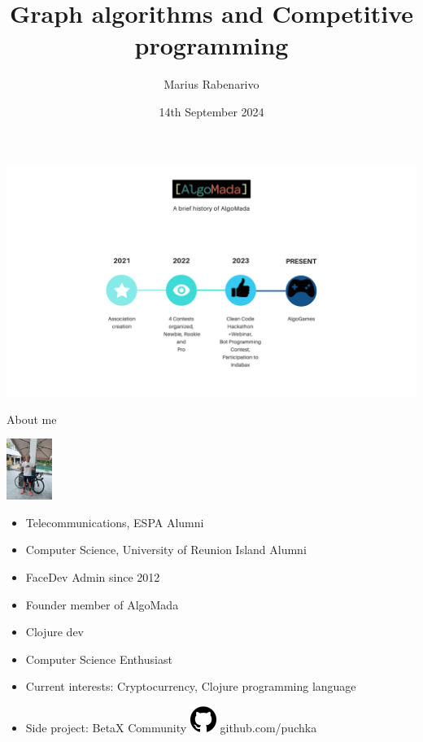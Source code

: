 \documentclass[ignorenonframetext,]{beamer}
\title{Graph algorithms and Competitive programming}
\author{Marius Rabenarivo}
\date{14th September 2024}
\providecommand{\tightlist}{%
  \setlength{\itemsep}{0pt}\setlength{\parskip}{0pt}}
\begin{document}
\frame{\titlepage}

\begin{frame}

\includegraphics{AlgoMada.png}

\end{frame}

\begin{frame}{About me}
\protect\hypertarget{about-me}{}

\includegraphics[width=\textwidth,height=0.78125in]{marius.jpg}

\begin{itemize}
\tightlist
\item
  Telecommunications, ESPA Alumni
\item
  Computer Science, University of Reunion Island Alumni
\item
  FaceDev Admin since 2012
\item
  Founder member of AlgoMada
\item
  Clojure dev
\item
  Computer Science Enthusiast
\item
  Current interests: Cryptocurrency, Clojure programming language
\item
  Side project: BetaX Community
  \includegraphics[width=\textwidth,height=0.33333in]{github-logo.png}
  github.com/puchka
\end{itemize}

\end{frame}
\end{document}
